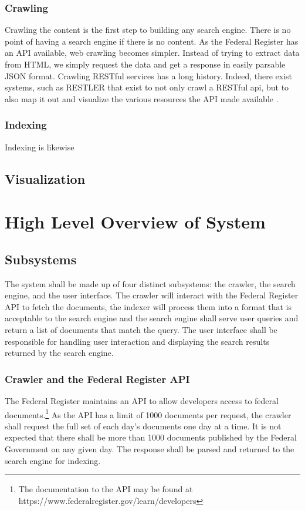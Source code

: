 \documentclass{sig-alternate-05-2015}
\begin{document}
\subsubsection{Crawling}
Crawling the content is the first step to building any search engine. There is no point of having a search engine if there is no content. As the Federal Register has an API available, web crawling becomes simpler. Instead of trying to extract data from HTML, we simply request the data and get a response in easily parsable JSON format. Crawling RESTful services has a long history. Indeed, there exist systems, such as RESTLER that exist to not only crawl a RESTful api, but to also map it out and visualize the various resources the API made available \cite{REST}.
\subsubsection{Indexing}
Indexing is likewise 
\subsection{Visualization}

\section{High Level Overview of System}
\subsection{Subsystems}
The system shall be made up of four distinct subsystems: the crawler, the search engine, and the user interface. The crawler will interact with the Federal Register API to fetch the documents, the indexer will process them into a format that is acceptable to the search engine and the search engine shall serve user queries and return a list of documents that match the query. The user interface shall be responsible for handling user interaction and displaying the search results returned by the search engine.

\subsubsection{Crawler and the Federal Register API}
The Federal Register maintains an API to allow developers access to federal documents.\footnote{The documentation to the API may be found at https://www.federalregister.gov/learn/developers} As the API has a limit of 1000 documents per request, the crawler shall request the full set of each day's documents one day at a time. It is not expected that there shall be more than 1000 documents published by the Federal Government on any given day. The response shall be parsed and returned to the search engine for indexing. 
\end{document}
